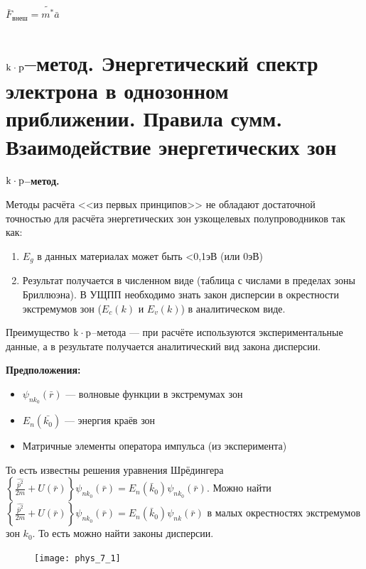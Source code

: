 $\bar{F}_\text{внеш} =  \widetilde{m^*}\bar{a}$

\section{$\rm k \cdot p$--метод. Энергетический спектр электрона в однозонном приближении. Правила сумм. Взаимодействие энергетических зон}

\textbf{$\rm k \cdot p$--метод.}

Методы расчёта <<из первых принципов>> не обладают достаточной точностью для расчёта энергетических зон узкощелевых полупроводников так как:

\begin{enumerate}
    \item $E_g$ в данных материалах может быть <0,1эВ (или 0эВ)
    \item Результат получается в численном виде (таблица с числами в пределах зоны Бриллюэна). В УЩПП необходимо знать закон дисперсии в окрестности экстремумов зон ($E_c (k)$ и $E_v (k)$) в аналитическом виде.
\end{enumerate}

Преимущество $\rm k \cdot p$--метода --- при расчёте используются экспериментальные данные, а в результате получается аналитический вид закона дисперсии.

\textbf{Предположения:}

\begin{itemize}
    \item $\psi _{n k_0}(\bar{r})$ --- волновые функции в экстремумах зон
    \item $E_n(\bar{k_0})$ --- энергия краёв зон
    \item Матричные элементы оператора импульса (из эксперимента)
\end{itemize}
 То есть известны решения уравнения Шрёдингера $\displaystyle \left\{\frac{\widehat{\bar{p}^2}}{2 m}+U(\bar{r})\right\} \psi_{n k_0}(\bar{r})=E_n\left(\bar{k}_0\right) \psi_{n k_0}(\bar{r})$. Можно найти $\displaystyle \left\{\frac{\widehat{\bar{p}^2}}{2 m}+U(\bar{r})\right\} \psi_{n k_0}(\bar{r})=E_n\left(\bar{k}_0\right) \psi_{n k}(\bar{r})$ в малых окрестностях экстремумов зон $k_0$. То есть можно найти законы дисперсии.

 \begin{figure}[h!]
    \centering
    \texttt{[image: phys\_7\_1]}
    
 \end{figure}

